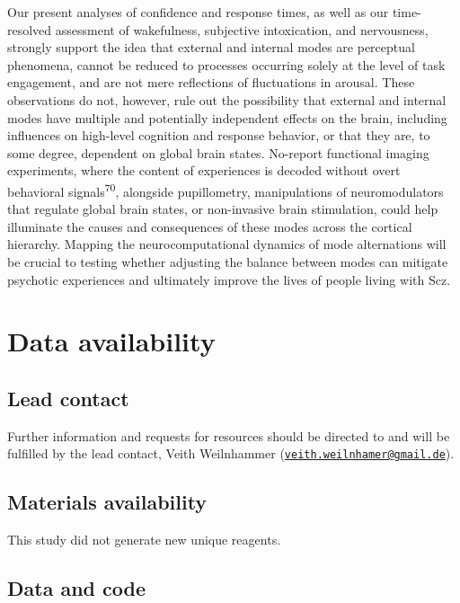 \documentclass[
]{article}
\begin{document}
Our present analyses of confidence and response times, as well as our
time-resolved assessment of wakefulness, subjective intoxication, and
nervousness, strongly support the idea that external and internal modes
are perceptual phenomena, cannot be reduced to processes occurring
solely at the level of task engagement, and are not mere reflections of
fluctuations in arousal. These observations do not, however, rule out
the possibility that external and internal modes have multiple and
potentially independent effects on the brain, including influences on
high-level cognition and response behavior, or that they are, to some
degree, dependent on global brain states. No-report functional imaging
experiments, where the content of experiences is decoded without overt
behavioral signals\textsuperscript{70}, alongside pupillometry,
manipulations of neuromodulators that regulate global brain states, or
non-invasive brain stimulation, could help illuminate the causes and
consequences of these modes across the cortical hierarchy. Mapping the
neurocomputational dynamics of mode alternations will be crucial to
testing whether adjusting the balance between modes can mitigate
psychotic experiences and ultimately improve the lives of people living
with Scz.

\section{Data availability}\label{data-availability}

\subsection{Lead contact}\label{lead-contact}

Further information and requests for resources should be directed to and
will be fulfilled by the lead contact, Veith Weilnhammer
(\href{mailto:veith.weilnhamer@gmail.de}{\nolinkurl{veith.weilnhamer@gmail.de}}).

\subsection{Materials availability}\label{materials-availability}

This study did not generate new unique reagents.

\subsection{Data and code}\label{data-and-code}
\end{document}
